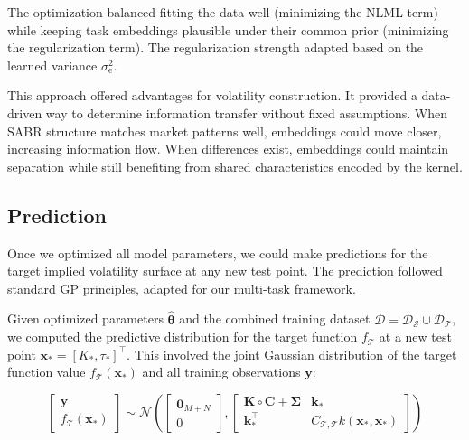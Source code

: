 \documentclass[preprint,12pt]{elsarticle}
\begin{document}
The optimization balanced fitting the data well (minimizing the NLML term) while keeping task embeddings plausible under their common prior (minimizing the regularization term). The regularization strength adapted based on the learned variance $\sigma^2_{\text{e}}$.

This approach offered advantages for volatility construction. It provided a data-driven way to determine information transfer without fixed assumptions. When SABR structure matches market patterns well, embeddings could move closer, increasing information flow. When differences exist, embeddings could maintain separation while still benefiting from shared characteristics encoded by the kernel. 

\subsection{Prediction}

Once we optimized all model parameters, we could make predictions for the target implied volatility surface at any new test point. The prediction followed standard GP principles, adapted for our multi-task framework.

Given optimized parameters $\hat{\boldsymbol{\theta}}$ and the combined training dataset $\mathcal{D} = \mathcal{D}_\mathcal{S} \cup \mathcal{D}_\mathcal{T}$, we computed the predictive distribution for the target function $f_\mathcal{T}$ at a new test point $\mathbf{x}_\ast = [K_\ast, \tau_\ast]^\intercal$. This involved the joint Gaussian distribution of the target function value $f_\mathcal{T}(\mathbf{x}_\ast)$ and all training observations $\mathbf{y}$:

\begin{equation}
   \begin{bmatrix} \mathbf{y} \\ f_\mathcal{T}(\mathbf{x}_\ast)\end{bmatrix}
    \sim 
    \mathcal{N}\left(\begin{bmatrix} \mathbf{0}_{M+N} \\ 0 \end{bmatrix}, 
    \begin{bmatrix}
    \mathbf{K}\circ \mathbf{C} + \bm{\Sigma} & \mathbf{k}_\ast
    \\
    \mathbf{k}_\ast^{\intercal} & C_{\mathcal{T,T}} k(\mathbf{x}_{\ast},\mathbf{x}_{\ast})
    \end{bmatrix} \right)
\end{equation}
\end{document}
